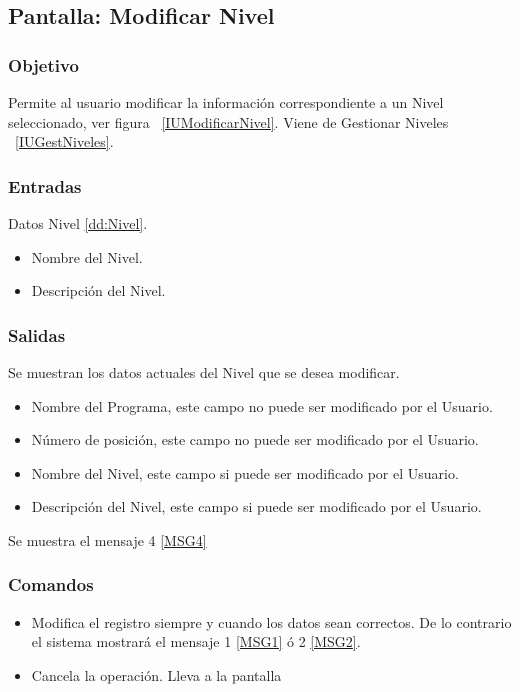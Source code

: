 \subsection{Pantalla: Modificar Nivel}

\subsubsection{Objetivo}
Permite al usuario modificar la información correspondiente a un Nivel seleccionado, ver figura ~\ref{IUModificarNivel}. Viene de Gestionar Niveles ~\ref{IUGestNiveles}.


\subsubsection{Entradas}
Datos Nivel \ref{dd:Nivel}.
\begin{itemize}
 \item Nombre del Nivel.
 \item Descripción del Nivel.
\end{itemize}

\subsubsection{Salidas}
Se muestran los datos actuales del Nivel que se desea modificar.
\begin{itemize}
 \item Nombre del Programa, este campo no puede ser modificado por el Usuario.
 \item Número de posición, este campo no puede ser modificado por el Usuario.
 \item Nombre del Nivel, este campo si puede ser modificado por el Usuario.
 \item Descripción del Nivel, este campo si puede ser modificado por el Usuario.
\end{itemize}
Se muestra el mensaje 4 \ref{MSG4}


\subsubsection{Comandos}
\begin{itemize}
 \item {} Modifica el registro siempre y cuando los datos sean correctos. De lo contrario el sistema mostrará el mensaje 1 \ref{MSG1} ó 2 \ref{MSG2}.
 \item {} Cancela la operación. Lleva a la pantalla 

\end{itemize}
